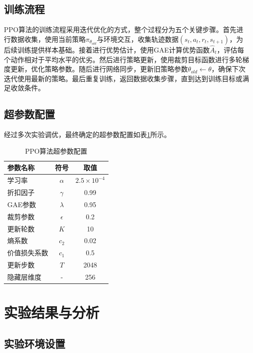 \documentclass[12pt,a4paper]{article}
\begin{document}
\subsection{训练流程}

PPO算法的训练流程采用迭代优化的方式，整个过程分为五个关键步骤。首先进行数据收集，使用当前策略$\pi_{\theta_{old}}$与环境交互，收集轨迹数据$(s_t, a_t, r_t, s_{t+1})$，为后续训练提供样本基础。接着进行优势估计，使用GAE计算优势函数$\hat{A}_t$，评估每个动作相对于平均水平的优劣。然后进行策略更新，使用裁剪目标函数进行多轮梯度更新，优化策略参数。随后进行网络同步，更新旧策略参数$\theta_{old} \leftarrow \theta$，确保下次迭代使用最新的策略。最后重复训练，返回数据收集步骤，直到达到训练目标或满足收敛条件。

\subsection{超参数配置}

经过多次实验调优，最终确定的超参数配置如表\ref{tab:hyperparameters}所示。

\begin{table}[H]
    \centering
    \caption{PPO算法超参数配置}
    \label{tab:hyperparameters}
    \begin{tabular}{lcc}
        \toprule
        \textbf{参数名称} & \textbf{符号} & \textbf{取值} \\
        \midrule
        学习率 & $\alpha$ & $2.5 \times 10^{-4}$ \\
        折扣因子 & $\gamma$ & 0.99 \\
        GAE参数 & $\lambda$ & 0.95 \\
        裁剪参数 & $\epsilon$ & 0.2 \\
        更新轮数 & $K$ & 10 \\
        熵系数 & $c_2$ & 0.02 \\
        价值损失系数 & $c_1$ & 0.5 \\
        更新步数 & $T$ & 2048 \\
        隐藏层维度 & - & 256 \\
        \bottomrule
    \end{tabular}
\end{table}

\section{实验结果与分析}

\subsection{实验环境设置}
\end{document}
